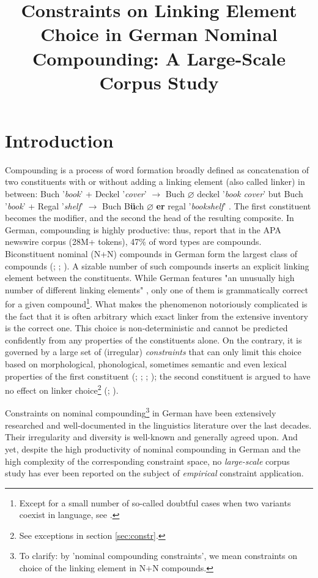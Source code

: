 \documentclass[10pt, a4paper]{article}
\title{Constraints on Linking Element Choice in German Nominal Compounding: A Large-Scale Corpus Study}
\newcommand{\zeroLinker}{\ensuremath{\boldsymbol{\varnothing}}}
\newcommand{\compEx}[7]{%
    #1 '\textit{#2}' + #4 '\textit{#5}'
    $\rightarrow$
    \if\relax\detokenize{#6}\relax
      #1%
    \else
      #6%
    \fi
    \if\relax\detokenize{#3}\relax
      \zeroLinker%
    \else
      \textbf{#3}%
    \fi
    \MakeLowercase{#4} '\textit{#7}'%
}
\begin{document}
\maketitleabstract



\section{Introduction}
\label{sec:intro}

Compounding is a process of word formation broadly defined as concatenation of two constituents with or without adding a linking element (also called linker) in between: \compEx{Buch}{book}{}{Deckel}{cover}{}{book cover} but \compEx{Buch}{book}{er}{Regal}{shelf}{B\textbf{ü}ch}{bookshelf}. The first constituent becomes the modifier, and the second the head of the resulting composite. In German, compounding is highly productive: thus, \citet{baroni_etal_2003} report that in the APA newswire corpus (28M+ tokens), 47\% of word types are compounds. Biconstituent nominal (N+N) compounds in German form the largest class of compounds (\citealp[53]{ortner_mueller-bollhagen_1991}; \citealp{scherer_2012}; \citealp{schluecker_2023}). A sizable number of such compounds inserts an explicit linking element between the constituents. While German features "an unusually high number of different linking elements" \citep{schaefer_pankratz_2018}, only one of them is grammatically correct for a given compound\footnote{Except for a small number of so-called doubtful cases when two variants coexist in language, see \citet{nuebling_szczepaniak_2013}.}. What makes the phenomenon notoriously complicated is the fact that it is often arbitrary which exact linker from the extensive inventory is the correct one. This choice is non-deterministic and cannot be predicted confidently from any properties of the constituents alone. On the contrary, it is governed by a large set of (irregular) \textit{constraints} that can only limit this choice based on morphological, phonological, sometimes semantic and even lexical properties of the first constituent (\citealp[227]{eisenberg_2013}; \citealp{kuerschner_2005}; \citealp{libben_etal_2009}; \citealp{schaefer_pankratz_2018}); the second constituent is argued to have no effect on linker choice\footnote{See exceptions in section \ref{sec:constr}.} (\citealp{kuerschner_2005}; \citealp[56]{ortner_mueller-bollhagen_1991}).

Constraints on nominal compounding\footnote{To clarify: by 'nominal compounding constraints', we mean constraints on choice of the linking element in N+N compounds.} in German have been extensively researched and well-documented in the linguistics literature over the last decades. Their irregularity and diversity is well-known and generally agreed upon. And yet, despite the high productivity of nominal compounding in German and the high complexity of the corresponding constraint space, no \textit{large-scale} corpus study has ever been reported on the subject of \textit{empirical} constraint application.
\end{document}
